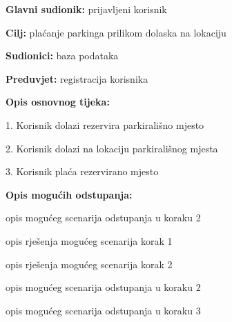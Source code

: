 					\noindent {}
					\begin{packed_item}
						
						
						\item \textbf{Glavni sudionik: }prijavljeni korisnik
						\item  \textbf{Cilj:} plaćanje parkinga prilikom dolaska na lokaciju
						\item  \textbf{Sudionici:} baza podataka
						\item  \textbf{Preduvjet:} registracija korisnika
						\item  \textbf{Opis osnovnog tijeka:}
						
						\item[] \begin{packed_enum}
							
							\item 1. Korisnik dolazi rezervira parkirališno mjesto
							\item 2. Korisnik dolazi na lokaciju parkirališnog mjesta
							\item 3. Korisnik plaća rezervirano mjesto
						\end{packed_enum}
						
						\item  \textbf{Opis mogućih odstupanja:}
						
						\item[] \begin{packed_item}
							
							\item[2.a] opis mogućeg scenarija odstupanja u koraku 2
							\item[] \begin{packed_enum}
								
								\item opis rješenja mogućeg scenarija korak 1
								\item opis rješenja mogućeg scenarija korak 2
								
							\end{packed_enum}
							\item[2.b] opis mogućeg scenarija odstupanja u koraku 2
							\item[3.a] opis mogućeg scenarija odstupanja  u koraku 3
							
						\end{packed_item}
					\end{packed_item}
					
